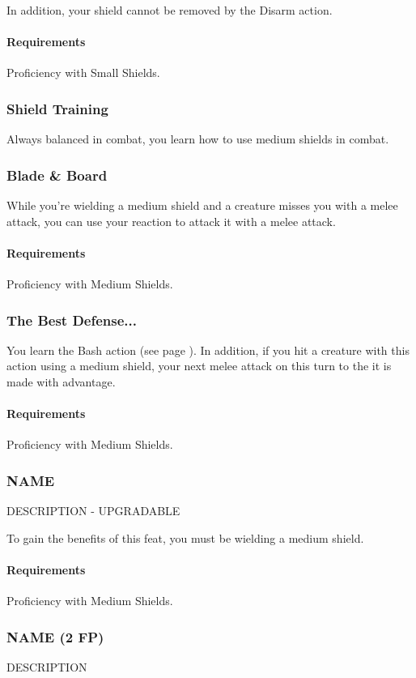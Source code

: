     In addition, your shield cannot be removed by the Disarm action.
    \paragraph{Requirements} Proficiency with Small Shields.
\subsubsection{Shield Training} \label{feat::shieldtraining}
    Always balanced in combat, you learn how to use medium shields in combat.
\subsubsection{Blade \& Board} \label{feat::bladeandboard}
    While you're wielding a medium shield and a creature misses you with a melee attack, you can use your reaction to attack it with a melee attack.
    \paragraph{Requirements} Proficiency with Medium Shields.
\subsubsection{The Best Defense...} \label{feat::thebestdefense}
    You learn the Bash action (see page \pageref{act::bash}).
    In addition, if you hit a creature with this action using a medium shield, your next melee attack on this turn to the it is made with advantage.
    \paragraph{Requirements} Proficiency with Medium Shields.
\subsubsection{NAME} \label{feat::name}
    DESCRIPTION - UPGRADABLE

    To gain the benefits of this feat, you must be wielding a medium shield.
    \paragraph{Requirements} Proficiency with Medium Shields.
\subsubsection{NAME (2 FP)} \label{feat::name}
    DESCRIPTION

